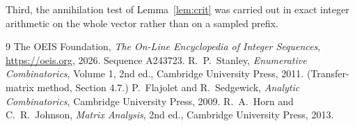 \documentclass[11pt,a4paper]{article}
\theoremstyle{plain}
\theoremstyle{definition}
\begin{document}
Third, the annihilation test of Lemma~\ref{lem:crit} was carried out in exact integer
arithmetic on the whole vector rather than on a sampled prefix.

\begin{thebibliography}{9}
 The OEIS Foundation, \emph{The On-Line Encyclopedia of Integer
Sequences}, \url{https://oeis.org}, 2026. Sequence A243723.
 R.~P.~Stanley, \emph{Enumerative Combinatorics}, Volume 1, 2nd ed.,
Cambridge University Press, 2011. (Transfer-matrix method, Section 4.7.)
 P.~Flajolet and R.~Sedgewick, \emph{Analytic Combinatorics}, Cambridge
University Press, 2009.
 R.~A.~Horn and C.~R.~Johnson, \emph{Matrix Analysis}, 2nd ed., Cambridge
University Press, 2013.
\end{thebibliography}
\end{document}
